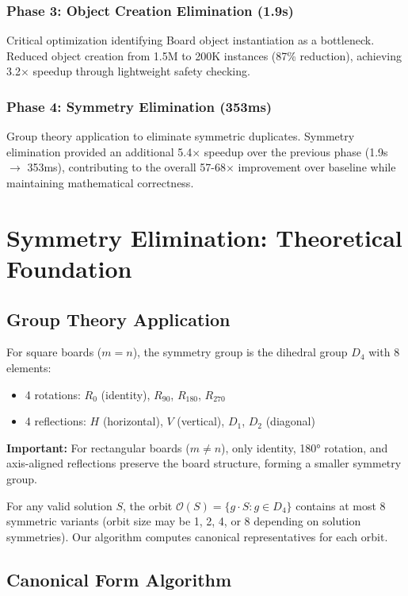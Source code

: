 \documentclass[12pt,a4paper]{article}
\theoremstyle{definition}
\begin{document}
\subsubsection{Phase 3: Object Creation Elimination (1.9s)}
Critical optimization identifying Board object instantiation as a bottleneck. Reduced object creation from 1.5M to 200K instances (87\% reduction), achieving 3.2$\times$ speedup through lightweight safety checking.

\subsubsection{Phase 4: Symmetry Elimination (353ms)}
Group theory application to eliminate symmetric duplicates. Symmetry elimination provided an additional 5.4$\times$ speedup over the previous phase (1.9s $\rightarrow$ 353ms), contributing to the overall 57-68$\times$ improvement over baseline while maintaining mathematical correctness.

\section{Symmetry Elimination: Theoretical Foundation}

\subsection{Group Theory Application}

For square boards ($m = n$), the symmetry group is the dihedral group $D_4$ with 8 elements:
\begin{itemize}
\item 4 rotations: $R_0$ (identity), $R_{90}$, $R_{180}$, $R_{270}$
\item 4 reflections: $H$ (horizontal), $V$ (vertical), $D_1$, $D_2$ (diagonal)
\end{itemize}

\textbf{Important:} For rectangular boards ($m \neq n$), only identity, 180° rotation, and axis-aligned reflections preserve the board structure, forming a smaller symmetry group.

For any valid solution $S$, the orbit $\mathcal{O}(S) = \{g \cdot S : g \in D_4\}$ contains at most 8 symmetric variants (orbit size may be 1, 2, 4, or 8 depending on solution symmetries). Our algorithm computes canonical representatives for each orbit.

\subsection{Canonical Form Algorithm}
\end{document}
